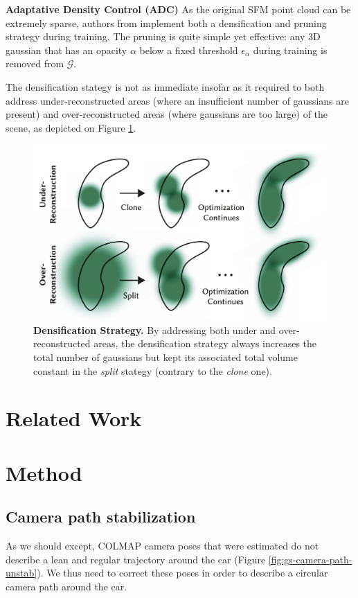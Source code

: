 \noindent \textbf{Adaptative Density Control (ADC)} 
As the original \ac{SFM} point cloud can be extremely sparse, authors from \cite{kerbl20233d} implement both a densification and pruning strategy during training. The pruning is quite simple yet effective: any 3D gaussian that has an opacity $\alpha$ below a fixed threshold $\epsilon_{\alpha}$ during training is removed from $\mathcal{G}$. 

The densification stategy is not as immediate insofar as it required to both address under-reconstructed areas (where an insufficient number of gaussians are present) and over-reconstructed areas (where gaussians are too large) of the scene, as depicted on Figure \ref{fig:gs-densification}. 

\begin{figure}[htb!]
  \center
\includegraphics[width=.7\linewidth]{images/gaussiansplatting/densification-strategy.png}
\caption{\textbf{Densification Strategy.} By addressing both under and over-reconstructed areas, the densification strategy always increases the total number of gaussians but kept its associated total volume  constant in the \textit{split} stategy (contrary to the \textit{clone} one).}
\label{fig:gs-densification}
\end{figure}



\section{Related Work}

\section{Method}
\subsection{Camera path stabilization}

As we should except, COLMAP camera poses that were estimated do not describe a lean and regular trajectory around the car (Figure \ref{fig:gs-camera-path-unstab}). We thus need to correct these poses in order to describe a circular camera path around the car. 


